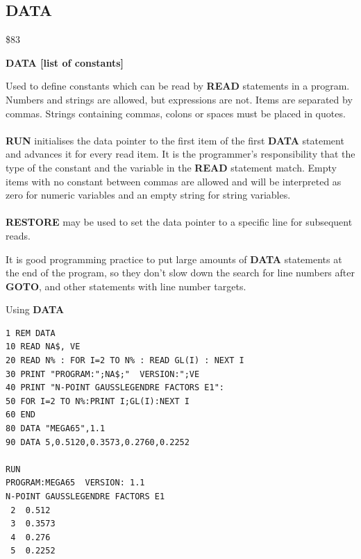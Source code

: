 
\newpage
\subsection{DATA}
\begin{description}[leftmargin=2cm,style=nextline]
\item [Token:] \$83
\item [Format:] {\bf DATA [list of constants]}
\item [Usage:] Used to define constants
               which can be read by {\bf READ} statements
               in a program. Numbers and strings are allowed, but expressions are not.
               Items are separated by commas.
               Strings containing commas, colons or spaces must be placed
               in quotes. \\
               \\
               {\bf RUN} initialises the data pointer
               to the first item of the first {\bf DATA} statement
               and advances it for every read item. It is the
               programmer's responsibility that the type of
               the constant and the variable in the {\bf READ}
               statement match. Empty items with no constant
               between commas are allowed and will be interpreted as
               zero for numeric variables and an empty string for
               string variables. \\
               \\
               {\bf RESTORE} may be used to set the
               data pointer to a specific line for subsequent
               reads.

\item [Remarks:] It is good programming practice to put large amounts of
               {\bf DATA} statements at the end of the program,
               so they don't slow down the search for line numbers
               after {\bf GOTO}, and other statements with line number targets.
\item [Example:] Using {\bf DATA}
\begin{tcolorbox}[colback=black,coltext=white]
\verbatimfont{\codefont}
\begin{verbatim}
1 REM DATA
10 READ NA$, VE
20 READ N% : FOR I=2 TO N% : READ GL(I) : NEXT I
30 PRINT "PROGRAM:";NA$;"  VERSION:";VE
40 PRINT "N-POINT GAUSSLEGENDRE FACTORS E1":
50 FOR I=2 TO N%:PRINT I;GL(I):NEXT I
60 END
80 DATA "MEGA65",1.1
90 DATA 5,0.5120,0.3573,0.2760,0.2252

RUN
PROGRAM:MEGA65  VERSION: 1.1
N-POINT GAUSSLEGENDRE FACTORS E1
 2  0.512
 3  0.3573
 4  0.276
 5  0.2252
\end{verbatim}
\end{tcolorbox}
\end{description}

